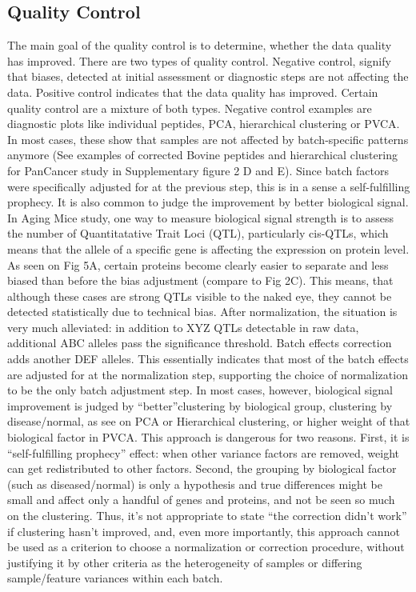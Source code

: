 \documentclass[num-refs]{wiley-article}
\begin{document}
\subsection{Quality Control}
The main goal of the quality control is to determine, whether the data quality has improved. There are two types of quality control. Negative control, signify that biases, detected at initial assessment or diagnostic steps are not affecting the data. Positive control indicates that the data quality has improved. Certain quality control are a mixture of both types.
Negative control examples are diagnostic plots like individual peptides, PCA, hierarchical clustering or PVCA. In most cases, these show that samples are not affected by batch-specific patterns anymore (See examples of corrected Bovine peptides and hierarchical clustering for PanCancer study in Supplementary figure 2 D and E). Since batch factors were specifically adjusted for at the previous step, this is in a sense a self-fulfilling prophecy.
It is also common to judge the improvement by better biological signal.  In Aging Mice study, one way to measure biological signal strength is to assess the number of Quantitatative Trait Loci (QTL), particularly cis-QTLs, which means that the allele of a specific gene is affecting the expression on protein level. As seen on Fig 5A, certain proteins become clearly easier to separate and less biased than before the bias adjustment (compare to Fig  2C). This means, that although these cases are strong QTLs visible to the naked eye, they cannot be detected statistically due to technical bias. After normalization, the situation is very much alleviated: in addition to XYZ QTLs detectable in raw data, additional ABC alleles pass the significance threshold. Batch effects correction adds another DEF alleles. This essentially indicates that most of the batch effects are adjusted for at the normalization step, supporting the choice of normalization to be the only batch adjustment step.
In most cases, however, biological signal improvement is judged by “better”clustering by biological group, clustering by disease/normal, as see on PCA or Hierarchical clustering, or higher weight of that biological factor in PVCA. This approach is dangerous for two reasons. First, it is “self-fulfilling prophecy” effect: when other variance factors are removed, weight can get redistributed to other factors. Second, the grouping by biological factor (such as diseased/normal) is only a hypothesis and true differences might be small and affect only a handful of genes and proteins, and not be seen so much on the clustering. Thus, it’s not appropriate to state “the correction didn’t work” if clustering hasn’t improved, and, even more importantly, this approach cannot be used as a criterion to choose a normalization or correction procedure, without justifying it by other criteria as the heterogeneity of samples or differing sample/feature variances within each batch.
\end{document}
